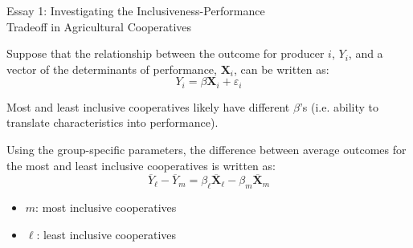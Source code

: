 \documentclass[aspectratio=169]{beamer}
\newenvironment{wideitemize}{\itemize\addtolength{\itemsep}{10pt}}{\enditemize}
\begin{document}
\begin{frame}{Essay 1: Investigating the Inclusiveness-Performance \\ \hspace{1.7cm} Tradeoff in Agricultural Cooperatives}
    \begin{wideitemize}
        \item Suppose that the relationship between the outcome for producer $i$, $Y_i$, and a vector of the determinants of performance, $\mathbf{X}_i$, can be written as: \vspace{.25cm}
            \begin{equation} \label{eq:E1_1}
                Y_i = \beta \mathbf{X}_i + \varepsilon_i 
            \end{equation} 
        \item Most and least inclusive cooperatives likely have different $\beta$'s (i.e. ability to translate characteristics into performance). 
        \item Using the group-specific parameters, the difference between average outcomes for the most and least inclusive cooperatives is written as: \vspace{.25cm}
            \begin{equation} \label{eq:E1_2}
                \overline{Y}_{\ell} - \overline{Y}_{m} =  \beta_{\ell}\overline{\mathbf{X}}_{\ell} - \beta_{m}\overline{\mathbf{X}}_{m}
            \end{equation}  
            \begin{itemize}
                \item $m$: most inclusive cooperatives
                \item $\ell$: least inclusive cooperatives 
            \end{itemize}
    \end{wideitemize}
\end{frame}
\end{document}
